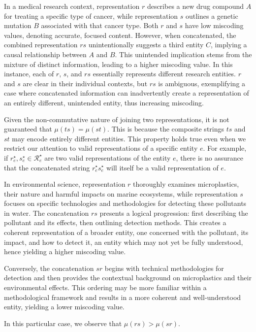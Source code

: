 \begin{example}
In a medical research context, representation $r$ describes a new drug compound $A$ for treating a specific type of cancer, while representation $s$ outlines a genetic mutation $B$ associated with that cancer type. Both $r$ and $s$ have low miscoding values, denoting accurate, focused content. However, when concatenated, the combined representation $rs$ unintentionally suggests a third entity $C$, implying a causal relationship between $A$ and $B$. This unintended implication stems from the mixture of distinct information, leading to a higher miscoding value. In this instance, each of $r$, $s$, and $rs$ essentially represents different research entities. $r$ and $s$ are clear in their individual contexts, but $rs$ is ambiguous, exemplifying a case where concatenated information can inadvertently create a representation of an entirely different, unintended entity, thus increasing miscoding.
\end{example}

Given the non-commutative nature of joining two representations, it is not guaranteed that $\mu(ts) = \mu(st)$. This is because the composite strings $ts$ and $st$ may encode entirely different entities. This property holds true even when we restrict our attention to valid representations of a specific entity $e$. For example, if $r^\star_e, s^\star_e \in \mathcal{R}^\star_{e}$ are two valid representations of the entity $e$, there is no assurance that the concatenated string $r^\star_e s^\star_e$ will itself be a valid representation of $e$.

\begin{example}
In environmental science, representation $r$ thoroughly examines microplastics, their nature and harmful impacts on marine ecosystems, while representation $s$ focuses on specific technologies and methodologies for detecting these pollutants in water. The concatenation $rs$ presents a logical progression: first describing the pollutant and its effects, then outlining detection methods. This creates a coherent representation of a broader entity, one concerned with the pollutant, its impact, and how to detect it, an entity which may not yet be fully understood, hence yielding a higher miscoding value.

Conversely, the concatenation $sr$ begins with technical methodologies for detection and then provides the contextual background on microplastics and their environmental effects. This ordering may be more familiar within a methodological framework and results in a more coherent and well-understood entity, yielding a lower miscoding value.

In this particular case, we observe that $\mu(rs) > \mu(sr)$.
\end{example}

